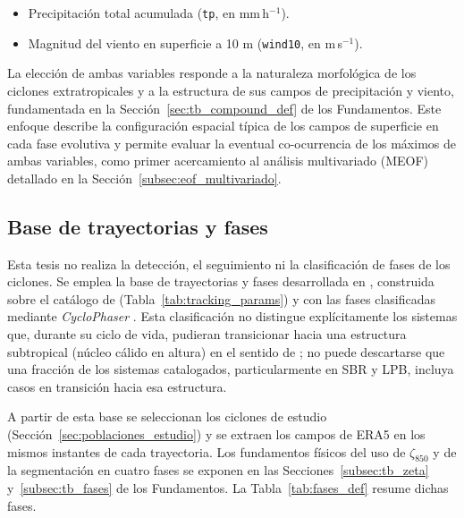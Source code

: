 \begin{itemize}
    \item Precipitación total acumulada (\texttt{tp}, en mm\,h$^{-1}$).
    \item Magnitud del viento en superficie a 10 m (\texttt{wind10}, en m\,s$^{-1}$).
\end{itemize}

La elección de ambas variables responde a la naturaleza morfológica de los ciclones extratropicales y a la estructura de sus campos de precipitación y viento, fundamentada en la Sección~\ref{sec:tb_compound_def} de los Fundamentos.
Este enfoque describe la configuración espacial típica de los campos de superficie en cada fase evolutiva y permite evaluar la eventual co-ocurrencia de los máximos de ambas variables, como primer acercamiento al análisis multivariado (MEOF) detallado en la Sección~\ref{subsec:eof_multivariado}.

\subsection{Base de trayectorias y fases}\label{sec:bd_ciclones}
Esta tesis no realiza la detección, el seguimiento ni la clasificación de fases de los ciclones.
Se emplea la base de trayectorias y fases desarrollada en \citet{coutodesouza2024thesis}, construida sobre el catálogo de \citet{gramcianinov2020analysis} (Tabla~\ref{tab:tracking_params}) y con las fases clasificadas mediante \textit{CycloPhaser} \citep{deSouza2025CycloPhaser}.
Esta clasificación no distingue explícitamente los sistemas que, durante su ciclo de vida, pudieran transicionar hacia una estructura subtropical (núcleo cálido en altura) en el sentido de \citet{hart2003cyclone}; no puede descartarse que una fracción de los sistemas catalogados, particularmente en SBR y LPB, incluya casos en transición hacia esa estructura.



A partir de esta base se seleccionan los ciclones de estudio (Sección~\ref{sec:poblaciones_estudio}) y se extraen los campos de ERA5 en los mismos instantes de cada trayectoria.
Los fundamentos físicos del uso de $\zeta_{850}$ y de la segmentación en cuatro fases se exponen en las Secciones~\ref{subsec:tb_zeta} y~\ref{subsec:tb_fases} de los Fundamentos. La Tabla~\ref{tab:fases_def} resume dichas fases.




